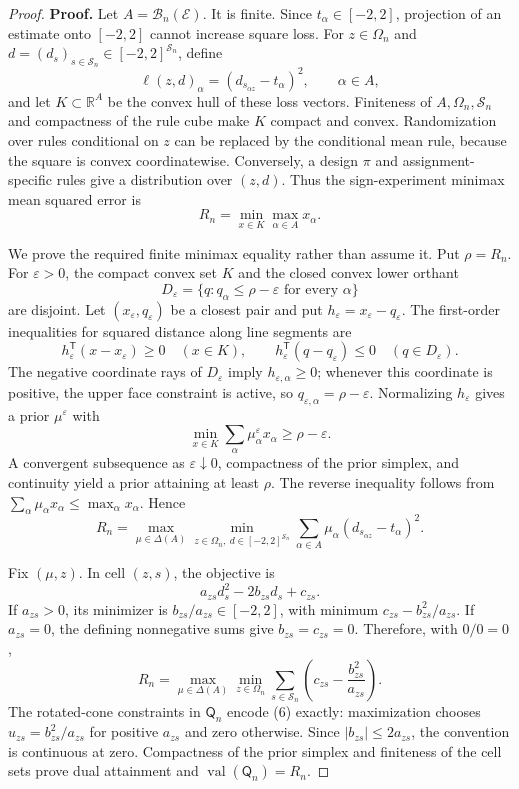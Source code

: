 \documentclass{article}
\begin{document}
\begin{proof}
\textbf{Proof.}
Let \(A=\mathcal B_n(\mathcal E)\). It is finite. Since \(t_\alpha\in[-2,2]\), projection of an estimate onto \([-2,2]\) cannot increase square loss. For \(z\in\Omega_n\) and \(d=(d_s)_{s\in\mathcal S_n}\in[-2,2]^{\mathcal S_n}\), define
\[
 \ell(z,d)_\alpha=(d_{s_{\alpha z}}-t_\alpha)^2,
 \qquad \alpha\in A,
\]
and let \(K\subset\mathbb R^A\) be the convex hull of these loss vectors. Finiteness of \(A,\Omega_n,\mathcal S_n\) and compactness of the rule cube make \(K\) compact and convex. Randomization over rules conditional on \(z\) can be replaced by the conditional mean rule, because the square is convex coordinatewise. Conversely, a design \(\pi\) and assignment-specific rules give a distribution over \((z,d)\). Thus the sign-experiment minimax mean squared error is
\[
 R_n=\min_{x\in K}\max_{\alpha\in A}x_\alpha. \tag{1}
\]

We prove the required finite minimax equality rather than assume it. Put \(\rho=R_n\). For \(\varepsilon>0\), the compact convex set \(K\) and the closed convex lower orthant
\[
 D_\varepsilon=\{q:q_\alpha\le\rho-\varepsilon\text{ for every }\alpha\}
\]
are disjoint. Let \((x_\varepsilon,q_\varepsilon)\) be a closest pair and put \(h_\varepsilon=x_\varepsilon-q_\varepsilon\). The first-order inequalities for squared distance along line segments are
\[
 h_\varepsilon^{\mathsf T}(x-x_\varepsilon)\ge0\quad(x\in K),
 \qquad
 h_\varepsilon^{\mathsf T}(q-q_\varepsilon)\le0\quad(q\in D_\varepsilon). \tag{2}
\]
The negative coordinate rays of \(D_\varepsilon\) imply \(h_{\varepsilon,\alpha}\ge0\); whenever this coordinate is positive, the upper face constraint is active, so \(q_{\varepsilon,\alpha}=\rho-\varepsilon\). Normalizing \(h_\varepsilon\) gives a prior \(\mu^\varepsilon\) with
\[
 \min_{x\in K}\sum_\alpha\mu^\varepsilon_\alpha x_\alpha
 \ge \rho-\varepsilon. \tag{3}
\]
A convergent subsequence as \(\varepsilon\downarrow0\), compactness of the prior simplex, and continuity yield a prior attaining at least \(\rho\). The reverse inequality follows from \(\sum_\alpha\mu_\alpha x_\alpha\le\max_\alpha x_\alpha\). Hence
\[
 R_n=\max_{\mu\in\Delta(A)}
 \min_{z\in\Omega_n,\ d\in[-2,2]^{\mathcal S_n}}
 \sum_{\alpha\in A}\mu_\alpha(d_{s_{\alpha z}}-t_\alpha)^2. \tag{4}
\]

Fix \((\mu,z)\). In cell \((z,s)\), the objective is
\[
 a_{zs}d_s^2-2b_{zs}d_s+c_{zs}. \tag{5}
\]
If \(a_{zs}>0\), its minimizer is \(b_{zs}/a_{zs}\in[-2,2]\), with minimum \(c_{zs}-b_{zs}^2/a_{zs}\). If \(a_{zs}=0\), the defining nonnegative sums give \(b_{zs}=c_{zs}=0\). Therefore, with \(0/0=0\),
\[
 R_n=\max_{\mu\in\Delta(A)}\min_{z\in\Omega_n}
 \sum_{s\in\mathcal S_n}
 \left(c_{zs}-\frac{b_{zs}^2}{a_{zs}}\right). \tag{6}
\]
The rotated-cone constraints in \(\mathsf Q_n\) encode (6) exactly: maximization chooses \(u_{zs}=b_{zs}^2/a_{zs}\) for positive \(a_{zs}\) and zero otherwise. Since \(|b_{zs}|\le2a_{zs}\), the convention is continuous at zero. Compactness of the prior simplex and finiteness of the cell sets prove dual attainment and \(\operatorname{val}(\mathsf Q_n)=R_n\).


\end{proof}
\end{document}
